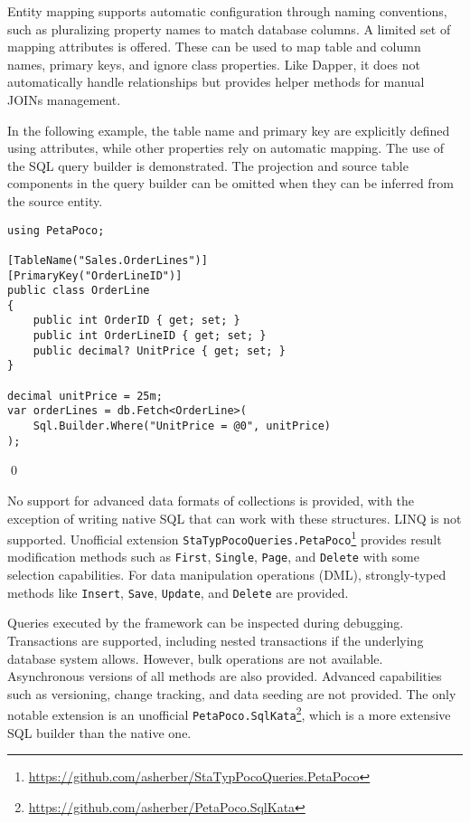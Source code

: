 Entity mapping supports automatic configuration through naming conventions, such as pluralizing property names to match database columns. A limited set of mapping attributes is offered. These can be used to map table and column names, primary keys, and ignore class properties. Like Dapper, it does not automatically handle relationships but provides helper methods for manual JOINs management.

\begin{example}
\small
In the following example, the table name and primary key are explicitly defined using attributes, while other properties rely on automatic mapping. The use of the SQL query builder is demonstrated. The projection and source table components in the query builder can be omitted when they can be inferred from the source entity.

\begin{lstlisting}[language=CSharp]
using PetaPoco;

[TableName("Sales.OrderLines")]
[PrimaryKey("OrderLineID")]
public class OrderLine
{
    public int OrderID { get; set; }
    public int OrderLineID { get; set; }
    public decimal? UnitPrice { get; set; }
}

decimal unitPrice = 25m;
var orderLines = db.Fetch<OrderLine>(
    Sql.Builder.Where("UnitPrice = @0", unitPrice)
);
\end{lstlisting}
\qed
\end{example}

No support for advanced data formats of collections is provided, with the exception of writing native SQL that can work with these structures. LINQ is not supported. Unofficial extension \texttt{StaTypPocoQueries.PetaPoco}\footnote{\url{https://github.com/asherber/StaTypPocoQueries.PetaPoco}} provides result modification methods such as \texttt{First}, \texttt{Single}, \texttt{Page}, and \texttt{Delete} with some selection capabilities. For data manipulation operations (DML), strongly-typed methods like \texttt{Insert}, \texttt{Save}, \texttt{Update}, and \texttt{Delete} are provided. 

Queries executed by the framework can be inspected during debugging. Transactions are supported, including nested transactions if the underlying database system allows. However, bulk operations are not available. Asynchronous versions of all methods are also provided. Advanced capabilities such as versioning, change tracking, and data seeding are not provided. The only notable extension is an unofficial \texttt{PetaPoco.SqlKata}\footnote{\url{https://github.com/asherber/PetaPoco.SqlKata}}, which is a more extensive SQL builder than the native one.


